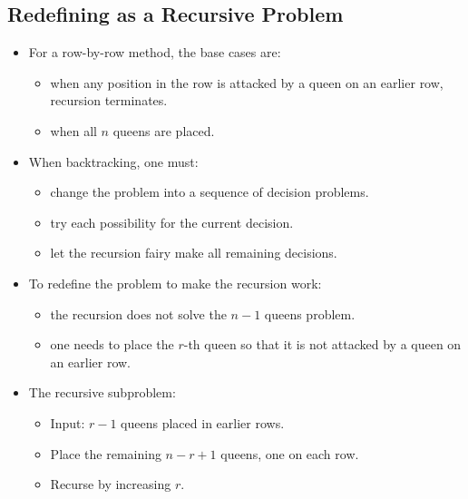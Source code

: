 \subsection{Redefining as a Recursive Problem}
\begin{itemize}
    \item For a row-by-row method, the base cases are:
    \begin{itemize}
        \item when any position in the row is attacked by a queen on an earlier row, recursion terminates.
        \item when all $n$ queens are placed.
    \end{itemize}
    \item When backtracking, one must:
    \begin{itemize}
        \item change the problem into a sequence of decision problems.
        \item try each possibility for the current decision.
        \item let the recursion fairy make all remaining decisions.
    \end{itemize}
    \item To redefine the problem to make the recursion work:
    \begin{itemize}
        \item the recursion does not solve the $n - 1$ queens problem.
        \item one needs to place the $r$-th queen so that it is not attacked by a queen on an earlier row.
    \end{itemize}
    \item The recursive subproblem:
    \begin{itemize}
        \item Input: $r - 1$ queens placed in earlier rows.
        \item Place the remaining $n - r + 1$ queens, one on each row.
        \item Recurse by increasing $r$.
    \end{itemize}
\end{itemize}
